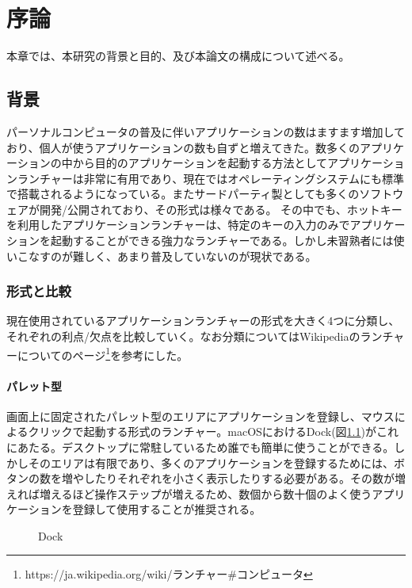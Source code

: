 \chapter{序論}
\label{chap:introduction}

本章では、本研究の背景と目的、及び本論文の構成について述べる。

\newpage

\section{背景}
パーソナルコンピュータの普及に伴いアプリケーションの数はますます増加しており、個人が使うアプリケーションの数も自ずと増えてきた。数多くのアプリケーションの中から目的のアプリケーションを起動する方法としてアプリケーションランチャーは非常に有用であり、現在ではオペレーティングシステムにも標準で搭載されるようになっている。またサードパーティ製としても多くのソフトウェアが開発/公開されており、その形式は様々である。
その中でも、ホットキーを利用したアプリケーションランチャーは、特定のキーの入力のみでアプリケーションを起動することができる強力なランチャーである。しかし未習熟者には使いこなすのが難しく、あまり普及していないのが現状である。

\subsection{形式と比較}
現在使用されているアプリケーションランチャーの形式を大きく4つに分類し、それぞれの利点/欠点を比較していく。なお分類についてはWikipediaのランチャーについてのページ\footnote{https://ja.wikipedia.org/wiki/ランチャー\#コンピュータ}を参考にした。

\subsubsection{パレット型}

画面上に固定されたパレット型のエリアにアプリケーションを登録し、マウスによるクリックで起動する形式のランチャー。macOSにおけるDock(図\ref{fig:dock})がこれにあたる。デスクトップに常駐しているため誰でも簡単に使うことができる。しかしそのエリアは有限であり、多くのアプリケーションを登録するためには、ボタンの数を増やしたりそれぞれを小さく表示したりする必要がある。その数が増えれば増えるほど操作ステップが増えるため、数個から数十個のよく使うアプリケーションを登録して使用することが推奨される。

\begin{figure}[h]
    \begin{center}
    \end{center}
    \caption{Dock}
    \label{fig:dock}
\end{figure}

